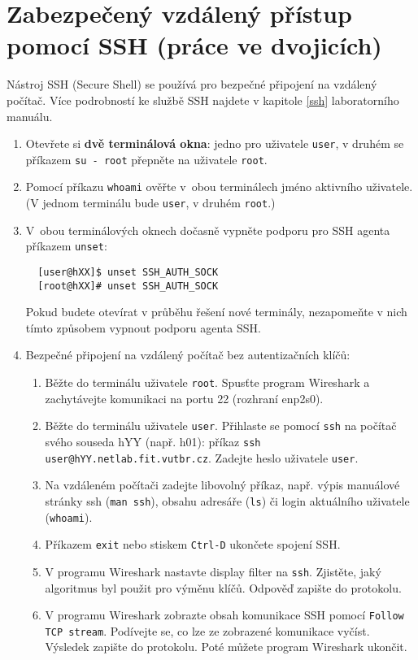 \documentclass[a4paper,11pt]{article}
\begin{document}
\section{Zabezpečený vzdálený přístup pomocí SSH (práce ve dvojicích)}
Nástroj SSH (Secure Shell) se používá pro bezpečné připojení na vzdálený počítač. Více podrobností ke službě SSH najdete v kapitole \ref{ssh} laboratorního manuálu.
\begin{enumerate}
  \item Otevřete si {\bf dvě terminálová okna}: jedno pro uživatele {\tt user}, v druhém se příkazem {\tt su - root} přepněte na uživatele {\tt root}.
  \item Pomocí příkazu {\tt whoami} ověřte v~obou terminálech jméno aktivního uživatele. \\
  (V jednom terminálu bude {\tt user}, v druhém {\tt root}.)
  \item V~obou terminálových oknech dočasně vypněte podporu pro SSH agenta příkazem {\tt unset}:
  \begin{lstlisting}
  [user@hXX]$ unset SSH_AUTH_SOCK
  [root@hXX]# unset SSH_AUTH_SOCK
  \end{lstlisting}

  Pokud budete otevírat v průběhu řešení nové terminály, nezapomeňte v nich tímto způsobem vypnout podporu agenta SSH.

  \item Bezpečné připojení na vzdálený počítač bez autentizačních klíčů:
    \begin{enumerate}
      \item Běžte do terminálu uživatele {\tt root}. Spusťte program Wireshark
      a zachytávejte komunikaci na portu 22 (rozhraní enp2s0).
      \item Běžte do terminálu uživatele {\tt user}.
      Přihlaste se pomocí {\tt ssh} na počítač svého souseda hYY (např. h01): příkaz
        {\tt ssh user@hYY.netlab.fit.vutbr.cz}. Zadejte heslo uživatele {\tt user}.
      \item Na vzdáleném počítači zadejte libovolný příkaz, např. výpis manuálové stránky ssh ({\tt man ssh}), obsahu adresáře ({\tt ls}) či login aktuálního uživatele ({\tt whoami}).
      \item Příkazem {\tt exit} nebo stiskem {\tt Ctrl-D} ukončete spojení SSH.
      \item V programu Wireshark nastavte display filter na {\tt ssh}. Zjistěte, jaký algoritmus byl použit pro výměnu klíčů. Odpověď zapište do protokolu.
      \item V programu Wireshark zobrazte obsah komunikace SSH pomocí {\tt Follow TCP stream}. Podí\-vej\-te se, co lze ze zobrazené komunikace vyčíst. Výsledek zapište do protokolu. Poté můžete program Wireshark ukončit.
    \end{enumerate}


\end{enumerate}
\end{document}
